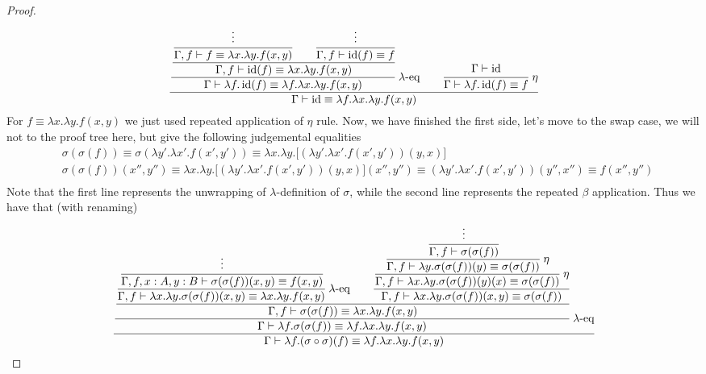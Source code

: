 \begin{dem}
\begin{proof}
    \begin{equation*}
        \cfrac{\cfrac{\cfrac{\cfrac{\vdots}{\Gamma, f\vdash f\equiv \lambda x.\lambda y.f(x, y)} \qquad \cfrac{\vdots}{\Gamma, f\vdash \operatorname{id}(f)\equiv f}}{\Gamma, f\vdash \operatorname{id}(f)\equiv \lambda x.\lambda y.f(x, y)}}{\Gamma\vdash\lambda f.\operatorname{id}(f)\equiv \lambda f.\lambda x.\lambda y.f(x, y)}\ \lambda\text{-eq}\qquad\cfrac{\Gamma\vdash\operatorname{id}}{\Gamma\vdash\lambda f.\operatorname{id}(f)\equiv f}\ \eta}{\Gamma\vdash\operatorname{id}\equiv \lambda f.\lambda x.\lambda y.f(x, y)}
    \end{equation*}
    For $f\equiv \lambda x.\lambda y.f(x, y)$ we just used repeated application of $\eta$ rule. Now, we have finished the first side, let's move to the swap case, we will not to the proof tree here, but give the following judgemental equalities
    \begin{equation*}
    \begin{aligned}
        &\sigma(\sigma(f))\equiv\sigma(\lambda y'.\lambda x'.f(x', y'))\equiv\lambda x.\lambda y.\big[(\lambda y'.\lambda x'.f(x', y'))(y, x)\big] \\
        &\sigma(\sigma(f))(x'', y'') \equiv \lambda x.\lambda y.\big[(\lambda y'.\lambda x'.f(x', y'))(y, x)\big](x'', y'')\equiv (\lambda y'.\lambda x'.f(x', y'))(y'', x'') \equiv f(x'', y'') \\
    \end{aligned}
    \end{equation*}
    Note that the first line represents the unwrapping of $\lambda$-definition of $\sigma$, while the second line represents the repeated $\beta$ application. Thus we have that (with renaming)
    \begin{equation*}
        \cfrac{\cfrac{\cfrac{\cfrac{\cfrac{\vdots}{\Gamma, f, x:A, y:B \vdash\sigma(\sigma(f))(x, y)\equiv f(x, y)}}{\Gamma, f \vdash \lambda x.\lambda y.\sigma(\sigma(f))(x, y)\equiv \lambda x.\lambda y.f(x, y)}\ \lambda\text{-eq}\qquad \cfrac{\cfrac{\cfrac{\cfrac{\vdots}{\Gamma, f\vdash \sigma(\sigma(f))}}{\Gamma, f\vdash \lambda y.\sigma(\sigma(f))(y)\equiv \sigma(\sigma(f))} \ \eta}{\Gamma, f\vdash \lambda x.\lambda y.\sigma(\sigma(f))(y)(x)\equiv \sigma(\sigma(f))}\ \eta}{\Gamma, f\vdash \lambda x.\lambda y.\sigma(\sigma(f))(x, y)\equiv \sigma(\sigma(f))}}{\Gamma, f\vdash \sigma(\sigma(f))\equiv\lambda x.\lambda y.f(x, y)}}{\Gamma\vdash\lambda f.\sigma(\sigma(f))\equiv\lambda f.\lambda x.\lambda y.f(x, y)}\ \lambda\text{-eq}}{\Gamma\vdash \lambda f.(\sigma\circ\sigma)(f)\equiv\lambda f.\lambda x.\lambda y.f(x, y)}

\end{equation*}
\end{proof}
\end{dem}
